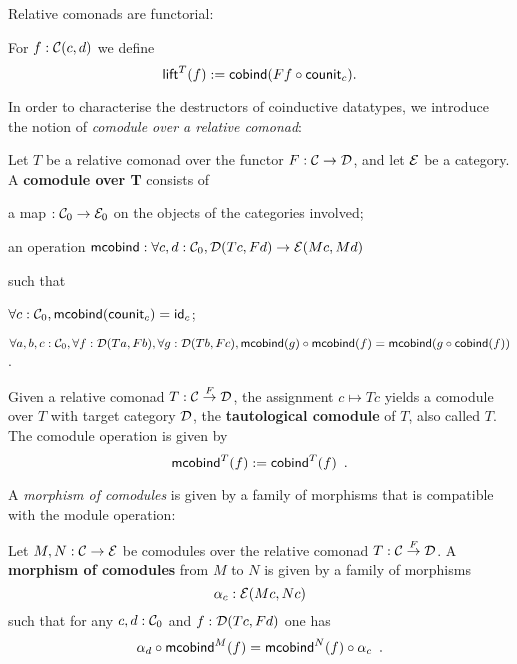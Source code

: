 \documentclass{amsart}
\newcommand{\fat}[1]{\textbf{#1}}
\begin{document}
Relative comonads are functorial:
\begin{definition}
 For $f : \C(c,d)$ we define
  \[ \lift^T(f) := \cobind(\comp{\counit_c}{Ff}) .  \]
\end{definition}


In order to characterise the destructors of coinductive datatypes, we introduce the notion of \emph{comodule
over a relative comonad}:

\begin{definition}
 Let $T$ be a relative comonad over the functor $F:\C\to\D$, and let $\E$ be a category.
 A \fat{comodule over T} consists of
   \begin{packitem}
   \item a map $:\C_0 \to \E_0$ on the objects of the categories involved;
   \item an operation $\mcobind: \forall c,d:\C_0, \D(Tc,Fd) \to \E(Mc,Md)$
  \end{packitem}
  such that 
  \begin{packitem}
   \item $\forall c : \C_0, \mcobind(\counit_c) = \id_c$;
   \item $\forall a,b,c:\C_0, \forall f : \D(Ta,Fb),\forall g:\D(Tb,Fc), \\
        \comp{\mcobind(f)}{\mcobind(g)} = \mcobind(\comp{\cobind(f)}{g})$ .
  \end{packitem}

\end{definition}

\begin{example}\label{tautological_comodule}
  Given a relative comonad $T : \C\stackrel{F}{\to}\D$, the assignment $c \mapsto Tc$ yields a comodule over $T$ 
  with target category $\D$, the \textbf{tautological comodule} of $T$, also called $T$.
  The comodule operation is given by
    \[  \mcobind^T(f) := \cobind^T(f) \enspace . \]
\end{example}


A \emph{morphism of comodules} is given by a family of morphisms that is compatible with 
the module operation:

\begin{definition}\label{def:morphism_of_comodules}
 Let $M, N : \C \to \E$ be comodules over the relative comonad $T : \C \stackrel{F}{\to} \D$.
 A \fat{morphism of comodules} from $M$ to $N$ is given by a family of morphisms 
   \[ \alpha_c:\E(Mc,Nc) \]
 such that for any $c,d:\C_0$ and $f : \D(Tc,Fd)$ one has
 \[   \comp{\mcobind^M(f)}{\alpha_d} = \comp{\alpha_c}{\mcobind^N(f)} \enspace . \]
\end{definition}
\end{document}
